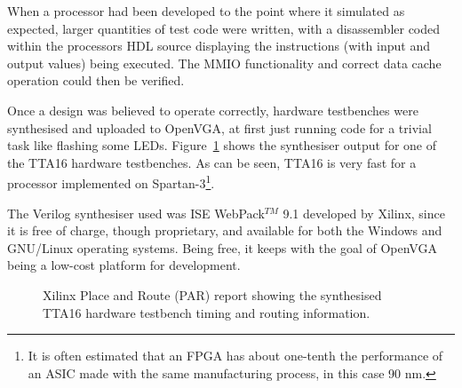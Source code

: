 When a processor had been developed to the point where it simulated as expected,
larger quantities of test code were written, with a disassembler coded within
the processors HDL source displaying the instructions (with input and output
values) being executed. The MMIO functionality and correct data cache operation
could then be verified.

Once a design was believed to operate correctly, hardware testbenches were
synthesised and uploaded to OpenVGA, at first just running code for a trivial
task like flashing some LEDs. Figure~\ref{TTA16_Synthesis} shows the synthesiser
output for one of the TTA16 hardware testbenches. As can be seen, TTA16 is very
fast for a processor implemented on Spartan-3\footnote{It is often estimated that
an FPGA has about one-tenth the performance of an ASIC made with the same
manufacturing process, in this case 90 nm.}.

The Verilog synthesiser used was ISE WebPack$^{TM}$ 9.1 developed by Xilinx,
since it is free of charge, though proprietary, and available for both the Windows and
GNU/Linux operating systems. Being free, it keeps with the goal of OpenVGA being
a low-cost platform for development.


\begin{figure}[h!]
\begin{center}
\caption[TTA16 synthesis timing report]{Xilinx Place and Route (PAR) report
showing the synthesised TTA16 hardware testbench timing and routing information.}
\label{TTA16_Synthesis}
\end{center}
\end{figure}





